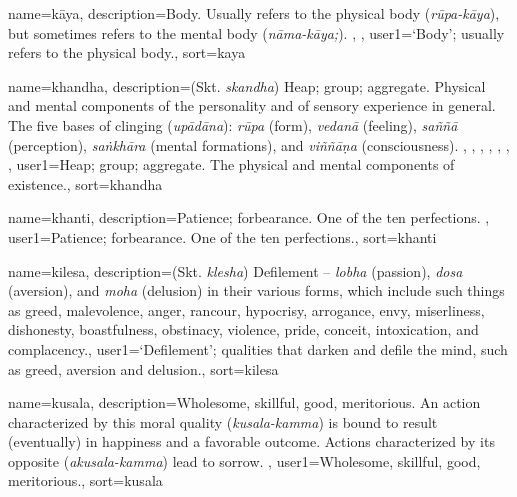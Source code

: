 {
name={k\=aya},
description={Body. Usually refers to the physical body (\textit{r\=upa-k\=aya}), but sometimes refers to the mental body (\textit{n\=ama-k\=aya;}). \protect \seepre %
\protect {}, \protect {}%
\protect \seepost %
},
user1={`Body'; usually refers to the physical body.},
sort={kaya}
}

{
name={khandha},
description={(Skt. \textit{skandha}) Heap; group; aggregate. Physical and mental components of the personality and of sensory experience in general. The five bases of clinging (\textit{up\=ad\=ana}): \textit{r\=upa} (form), \textit{vedan\=a} (feeling), \textit{sa\~n\~n\=a} (perception), \textit{sa\.nkh\=ara} (mental formations), and \textit{vi\~n\~n\=a\d{n}a} (consciousness). \protect \seepre %
\protect {}, \protect {}, \protect {}, \protect {}, \protect {}, \protect {}, \protect {}%
\protect \seepost %
},
user1={Heap; group; aggregate. The physical and mental components of existence.},
sort={khandha}
}

{
name={khanti},
description={Patience; forbearance. One of the ten perfections. \protect \seepre %
\protect {}%
\protect \seepost %
},
user1={Patience; forbearance. One of the ten perfections.},
sort={khanti}
}

{
name={kilesa},
description={(Skt. \textit{klesha}) Defilement -- \textit{lobha} (passion), \textit{dosa} (aversion), and \textit{moha} (delusion) in their various forms, which include such things as greed, malevolence, anger, rancour, hypocrisy, arrogance, envy, miserliness, dishonesty, boastfulness, obstinacy, violence, pride, conceit, intoxication, and complacency.},
user1={`Defilement'; qualities that darken and defile the mind, such as greed, aversion and delusion.},
sort={kilesa}
}

{
name={kusala},
description={Wholesome, skillful, good, meritorious. An action characterized by this moral quality (\textit{kusala-kamma}) is bound to result (eventually) in happiness and a favorable outcome. Actions characterized by its opposite (\textit{akusala-kamma}) lead to sorrow. \protect \seepre %
\protect {}%
\protect \seepost %
},
user1={Wholesome, skillful, good, meritorious.},
sort={kusala}
}

